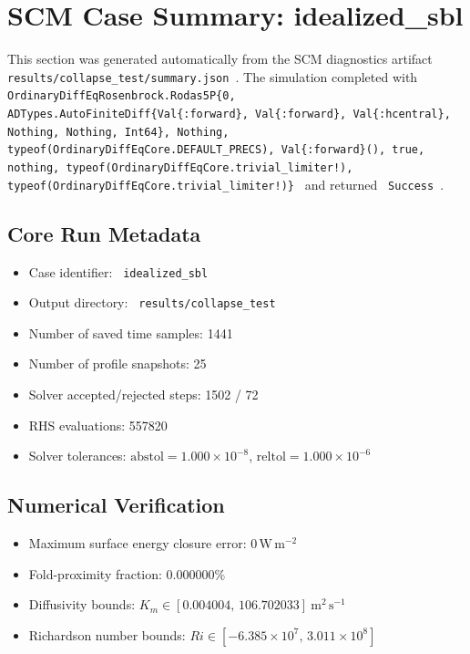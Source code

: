 \section{SCM Case Summary: idealized\_sbl}
\label{sec:scm_case_idealized_sbl}

This section was generated automatically from the SCM diagnostics artifact
\texttt{ results/collapse\_test/summary.json }. The simulation completed with \texttt{ OrdinaryDiffEqRosenbrock.Rodas5P\{0, ADTypes.AutoFiniteDiff\{Val\{:forward\}, Val\{:forward\}, Val\{:hcentral\}, Nothing, Nothing, Int64\}, Nothing, typeof(OrdinaryDiffEqCore.DEFAULT\_PRECS), Val\{:forward\}(), true, nothing, typeof(OrdinaryDiffEqCore.trivial\_limiter!), typeof(OrdinaryDiffEqCore.trivial\_limiter!)\} }
and returned \texttt{ Success }.

\subsection{Core Run Metadata}
\begin{itemize}
  \item Case identifier: \texttt{ idealized\_sbl }
  \item Output directory: \texttt{ results/collapse\_test }
  \item Number of saved time samples: 1441
  \item Number of profile snapshots: 25
  \item Solver accepted/rejected steps: 1502 / 72
  \item RHS evaluations: 557820
  \item Solver tolerances: $\mathrm{abstol}=1.000 \times 10^{-8}$, $\mathrm{reltol}=1.000 \times 10^{-6}$
\end{itemize}

\subsection{Numerical Verification}
\begin{itemize}
  \item Maximum surface energy closure error:
  $0\,\mathrm{W\,m^{-2}}$
  \item Fold-proximity fraction:
  $0.000000\%$
  \item Diffusivity bounds:
  $K_m \in [0.004004,\,106.702033]~\mathrm{m^2\,s^{-1}}$
  \item Richardson number bounds:
  $Ri \in [-6.385 \times 10^{7},\,3.011 \times 10^{8}]$
\end{itemize}

